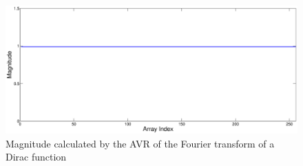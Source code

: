 \begin{figure}
\includegraphics[width=\textwidth]{./Figures/AVR_FFT_Dirac_Mag.eps}
\caption{Magnitude calculated by the AVR of the Fourier transform of a Dirac function}
\label{fig:AVR:FFT:Dirac:Mag}
\end{figure}

